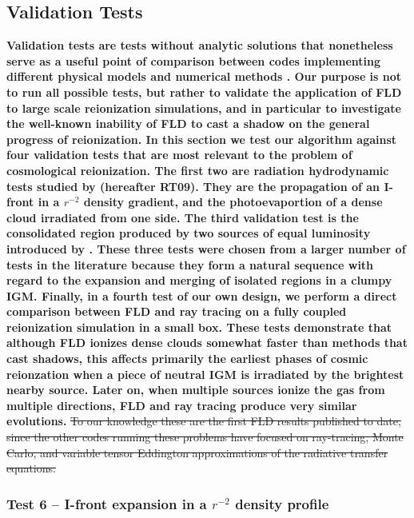 \subsection{Validation Tests}
{\bf Validation tests are tests without analytic solutions that nonetheless serve as a
useful point of comparison between codes implementing different physical 
models and numerical methods \citep{IlievEtAl2006,IlievEtAl2009}. Our purpose is not to run all possible tests, but rather to validate the application of FLD to large scale reionization simulations, and in particular to investigate the well-known inability of FLD to cast a shadow on the general progress of reionization.
In this section we test our algorithm against 
four validation tests that are most relevant to the problem of cosmological 
reionization. The first two are radiation hydrodynamic tests studied by \cite{IlievEtAl2009} (hereafter RT09). They are the propagation of an I-front in a $r^{-2}$ density gradient, and the photoevaportion of a dense cloud irradiated from one side. The third validation test is the consolidated \hii region produced by two sources of equal luminosity introduced by \cite{Petkova09}. These three tests were chosen from a larger number of tests in the literature because they form a natural sequence with regard to the expansion and merging of isolated \hii regions in a clumpy IGM.  Finally, in a fourth test of our own design, we perform a direct comparison between FLD and ray tracing on a fully coupled reionization simulation in a small box. These tests demonstrate that although FLD ionizes dense clouds somewhat faster than methods that cast shadows, this affects primarily the earliest phases of cosmic reionzation when  a piece of neutral IGM is irradiated by the brightest nearby source. Later on, when multiple sources ionize the gas from multiple directions, FLD and ray tracing produce very similar evolutions. }    \st{To our knowledge these are the first FLD results
published to date, since the other codes running these problems have
focused on ray-tracing, Monte Carlo, and variable tensor Eddington
approximations of the radiative transfer equations.} 





\subsubsection{Test 6 -- I-front expansion in a $r^{-2}$ density profile}
\label{subsec:test6}

